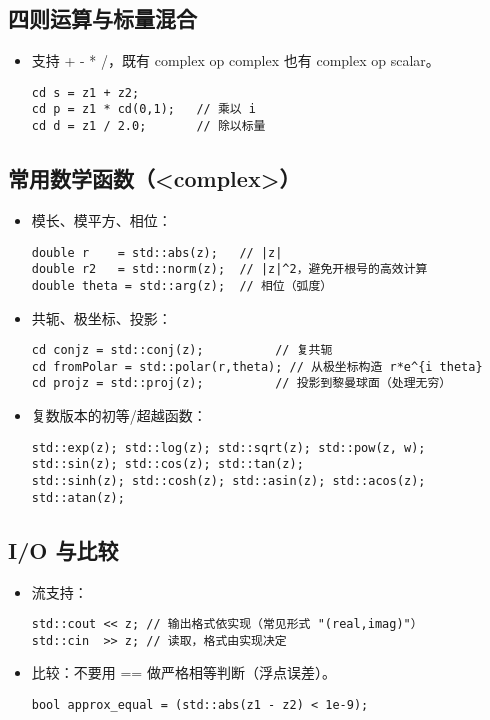 \documentclass[titlepage, a4paper]{report}
\begin{document}
\subsection*{四则运算与标量混合}
\begin{itemize}
  \item 支持 + - * /，既有 complex op complex 也有 complex op scalar。
\begin{verbatim}
cd s = z1 + z2;
cd p = z1 * cd(0,1);   // 乘以 i
cd d = z1 / 2.0;       // 除以标量
\end{verbatim}
\end{itemize}

\subsection*{常用数学函数（<complex>）}
\begin{itemize}
  \item 模长、模平方、相位：
  \begin{verbatim}
double r    = std::abs(z);   // |z|
double r2   = std::norm(z);  // |z|^2，避免开根号的高效计算
double theta = std::arg(z);  // 相位（弧度）
  \end{verbatim}
  \item 共轭、极坐标、投影：
  \begin{verbatim}
cd conjz = std::conj(z);          // 复共轭
cd fromPolar = std::polar(r,theta); // 从极坐标构造 r*e^{i theta}
cd projz = std::proj(z);          // 投影到黎曼球面（处理无穷）
  \end{verbatim}
  \item 复数版本的初等/超越函数：
  \begin{verbatim}
std::exp(z); std::log(z); std::sqrt(z); std::pow(z, w);
std::sin(z); std::cos(z); std::tan(z);
std::sinh(z); std::cosh(z); std::asin(z); std::acos(z); std::atan(z);
  \end{verbatim}
\end{itemize}

\subsection*{I/O 与比较}
\begin{itemize}
  \item 流支持：
\begin{verbatim}
std::cout << z; // 输出格式依实现（常见形式 "(real,imag)"）
std::cin  >> z; // 读取，格式由实现决定
\end{verbatim}
  \item 比较：不要用 == 做严格相等判断（浮点误差）。
\begin{verbatim}
bool approx_equal = (std::abs(z1 - z2) < 1e-9);
\end{verbatim}
\end{itemize}
\end{document}

